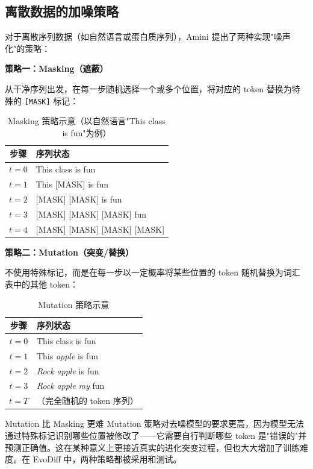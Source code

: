 \documentclass[a4paper]{article}
\begin{document}
\subsection{离散数据的加噪策略}

对于离散序列数据（如自然语言或蛋白质序列），Amini 提出了两种实现"噪声化"的策略：

\textbf{策略一：Masking（遮蔽）}

从干净序列出发，在每一步随机选择一个或多个位置，将对应的 token 替换为特殊的 \texttt{[MASK]} 标记：

\begin{table}[H]
\centering
\caption{Masking 策略示意（以自然语言"This class is fun"为例）}
\begin{tabular}{@{}cl@{}}
\toprule
\textbf{步骤} & \textbf{序列状态} \\
\midrule
$t=0$ & This class is fun \\
$t=1$ & This {[}MASK{]} is fun \\
$t=2$ & {[}MASK{]} {[}MASK{]} is fun \\
$t=3$ & {[}MASK{]} {[}MASK{]} {[}MASK{]} fun \\
$t=4$ & {[}MASK{]} {[}MASK{]} {[}MASK{]} {[}MASK{]} \\
\bottomrule
\end{tabular}
\end{table}

\textbf{策略二：Mutation（突变/替换）}

不使用特殊标记，而是在每一步以一定概率将某些位置的 token 随机替换为词汇表中的其他 token：

\begin{table}[H]
\centering
\caption{Mutation 策略示意}
\begin{tabular}{@{}cl@{}}
\toprule
\textbf{步骤} & \textbf{序列状态} \\
\midrule
$t=0$ & This class is fun \\
$t=1$ & This \textit{apple} is fun \\
$t=2$ & \textit{Rock} \textit{apple} is fun \\
$t=3$ & \textit{Rock} \textit{apple} \textit{my} fun \\
$t=T$ & （完全随机的 token 序列） \\
\bottomrule
\end{tabular}
\end{table}

\begin{warningbox}{Mutation 比 Masking 更难}
Mutation 策略对去噪模型的要求更高，因为模型无法通过特殊标记识别哪些位置被修改了——它需要自行判断哪些 token 是"错误的"并预测正确值。这在某种意义上更接近真实的进化突变过程，但也大大增加了训练难度。在 EvoDiff 中，两种策略都被采用和测试。
\end{warningbox}
\end{document}
